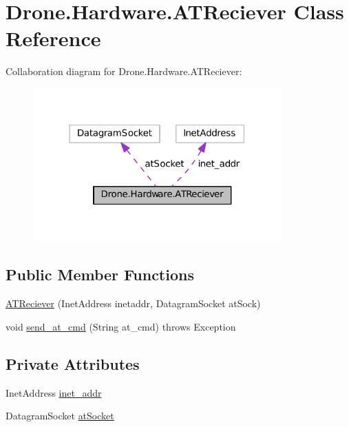 \hypertarget{class_drone_1_1_hardware_1_1_a_t_reciever}{}\section{Drone.\+Hardware.\+A\+T\+Reciever Class Reference}
\label{class_drone_1_1_hardware_1_1_a_t_reciever}


Collaboration diagram for Drone.\+Hardware.\+A\+T\+Reciever\+:\nopagebreak
\begin{figure}[H]
\begin{center}
\leavevmode
\includegraphics[width=270pt]{class_drone_1_1_hardware_1_1_a_t_reciever__coll__graph}
\end{center}
\end{figure}
\subsection*{Public Member Functions}
\begin{DoxyCompactItemize}
\item 
\hyperlink{class_drone_1_1_hardware_1_1_a_t_reciever_a634fc982b58c475a7bd7b4780416a9bb}{A\+T\+Reciever} (Inet\+Address inetaddr, Datagram\+Socket at\+Sock)
\item 
void \hyperlink{class_drone_1_1_hardware_1_1_a_t_reciever_a93352d75209626cf62bde294b35f9120}{send\+\_\+at\+\_\+cmd} (String at\+\_\+cmd)  throws Exception  	
\end{DoxyCompactItemize}
\subsection*{Private Attributes}
\begin{DoxyCompactItemize}
\item 
Inet\+Address \hyperlink{class_drone_1_1_hardware_1_1_a_t_reciever_a5253dfd32652a64fba8f0f2d00530866}{inet\+\_\+addr}
\item 
Datagram\+Socket \hyperlink{class_drone_1_1_hardware_1_1_a_t_reciever_ac5f975b3bdd5cf7346ff6649daf831aa}{at\+Socket}
\end{DoxyCompactItemize}


